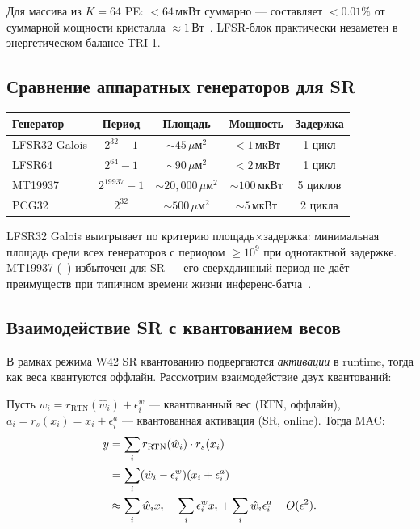 Для массива из $K = 64$ PE: $< 64\,\text{мкВт}$ суммарно —
составляет $< 0{.}01\%$ от суммарной мощности кристалла
$\approx 1\,\text{Вт}$~\cite{Weste-Harris-CMOS4}.  LFSR-блок
практически незаметен в энергетическом балансе TRI-1.

\subsection{Сравнение аппаратных генераторов для SR}
\label{ssec:glava88-rng-compare}

\begin{center}
\begin{tabular}{|l|c|c|c|c|}
\hline
Генератор & Период & Площадь & Мощность & Задержка \\
\hline
LFSR32 Galois & $2^{32}-1$ & $\sim 45\,\mu\text{м}^2$ & $<1\,\text{мкВт}$ & 1 цикл \\
LFSR64 & $2^{64}-1$ & $\sim 90\,\mu\text{м}^2$ & $<2\,\text{мкВт}$ & 1 цикл \\
MT19937 & $2^{19937}-1$ & $\sim 20{,}000\,\mu\text{м}^2$ & $\sim 100\,\text{мкВт}$ & 5 циклов \\
PCG32 & $2^{32}$ & $\sim 500\,\mu\text{м}^2$ & $\sim 5\,\text{мкВт}$ & 2 цикла \\
\hline
\end{tabular}
\end{center}

LFSR32 Galois выигрывает по критерию площадь×задержка:
минимальная площадь среди всех генераторов с периодом
$\geq 10^9$ при однотактной задержке.  MT19937 (~\citeauthor{micikevicius2017mixed})
избыточен для SR — его сверхдлинный период не даёт
преимуществ при типичном времени жизни инференс-батча~\cite{gupta2015}.

\subsection{Взаимодействие SR с квантованием весов}
\label{ssec:glava88-weight-quant}

В рамках режима W42 SR квантованию подвергаются \emph{активации}
в runtime, тогда как веса квантуются оффлайн.  Рассмотрим
взаимодействие двух квантований:

Пусть $w_i = r_{\mathrm{RTN}}(\hat{w}_i) + \epsilon_i^w$
— квантованный вес (RTN, оффлайн),
$a_i = r_s(x_i) = x_i + \epsilon_i^a$ — квантованная активация (SR, online).
Тогда MAC:
\begin{align}
  y &= \sum_i r_{\mathrm{RTN}}(\hat{w}_i) \cdot r_s(x_i)
  \notag \\
  &= \sum_i (\hat{w}_i - \epsilon_i^w)(x_i + \epsilon_i^a)
  \notag \\
  &\approx \sum_i \hat{w}_i x_i
    - \sum_i \epsilon_i^w x_i
    + \sum_i \hat{w}_i \epsilon_i^a
    + O(\epsilon^2).
  \label{eq:cross-quant}
\end{align}

